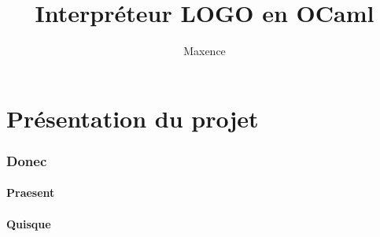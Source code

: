 \documentclass[a4paper]{article}
\title{Interpréteur LOGO en OCaml}           %
\author{Maxence \bsc{Ahlouche}}
\date{}                       %
\begin{document}
\maketitle                    %


\tableofcontents              %

\part{Présentation du projet}                %

\section{Donec}               %


\subsection{Praesent}         %


\subsection{Quisque}







\end{document}
